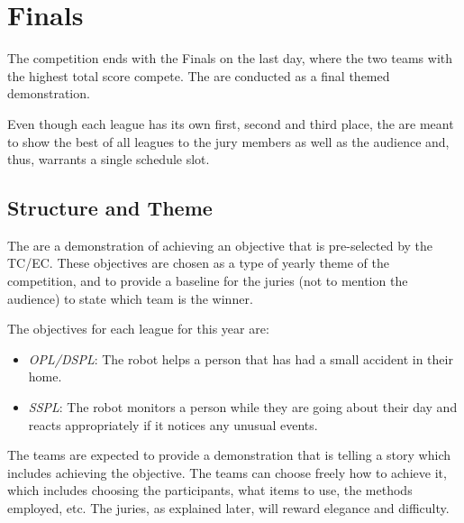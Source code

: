 \chapter{Finals}

The competition ends with the Finals on the last day, where the two teams with the highest total score compete.
The  are conducted as a final themed demonstration.


Even though each league has its own first, second and third place, the  are meant to show the best of all leagues to the jury members as well as the audience and, thus, warrants a single schedule slot.

\section{Structure and Theme}

The  are a demonstration of achieving an objective that is pre-selected by the TC/EC. These objectives are chosen as a type of yearly theme of the competition, and to provide a baseline for the juries (not to mention the audience) to state which team is the winner.

The objectives for each league for this year are:

\begin{itemize}
    \item \emph{OPL/DSPL}: The robot helps a person that has had a small accident in their home.
    \item \emph{SSPL}: The robot monitors a person while they are going about their day and reacts appropriately if it notices any unusual events.
\end{itemize}


The teams are expected to provide a demonstration that is telling a story which includes achieving the objective. The teams can choose freely how to achieve it, which includes choosing the participants, what items to use, the methods employed, etc. The juries, as explained later, will reward elegance and difficulty.

